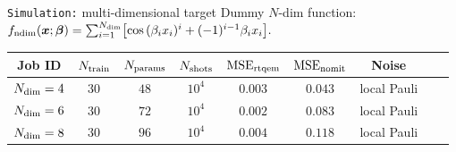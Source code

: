 \documentclass[8pt, xcolor={svgnames}, hyperref={linkcolor=black}, aspectratio=169]{beamer}
\begin{document}
\begin{frame}{\texttt{Simulation:} multi-dimensional target}
Dummy $N$-dim function: $ f_{\rm ndim}(\bm{x}; \bm{\beta}) = \sum_{i=1}^{N_{\rm dim}} \bigl[ \cos{(\beta_i x_i)^{i}} + 
(-1)^{i-1} \beta_i x_i \bigr]. $
\begin{center}
\footnotesize
\begin{tabular}{ccccccccc}
\hline \hline 
\rule{0pt}{2.5ex}
\textbf{Job ID} & $N_{\rm train}$ & $N_{\rm params}$ & $N_{\rm shots}$ 
& $\text{MSE}_{\rm rtqem}$ &  $\text{MSE}_{\rm nomit}$ & Noise \\
\hline
$N_{\rm dim}=4$ & $30$ & $48$ & $10^{4}$ &  $0.003$ & $0.043$ & local Pauli \\
$N_{\rm dim}=6$ & $30$ & $72$ & $10^{4}$ &  $0.002$ & $0.083$ & local Pauli \\
$N_{\rm dim}=8$ & $30$ & $96$ & $10^{4}$ &  $0.004$ & $0.118$ & local Pauli \\
\hline \hline 
\end{tabular}
\end{center}


\end{frame}
\end{document}
